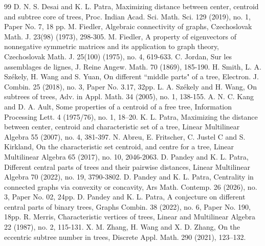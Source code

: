 \documentclass[10pt,a4paper]{amsart}
\begin{document}
\begin{thebibliography}{99}
 D. N. S. Desai and K. L. Patra, Maximizing distance between center, centroid and subtree core of trees, Proc. Indian Acad. Sci. Math. Sci. 129 (2019), no. 1, Paper No. 7, 18 pp.
 M. Fiedler, Algebraic connectivity of graphs, Czechoslovak Math. J. 23(98) (1973), 298-305.
 M. Fiedler, A property of eigenvectors of nonnegative symmetric matrices and its application to graph theory, Czechoslovak Math. J. 25(100) (1975), no. 4, 619-633.  C. Jordan, Sur les assemblages de lignes, J. Reine Angew. Math. 70 (1869), 185-190.
 H. Smith, L. A. Sz\'ekely, H. Wang and S. Yuan, On different ``middle parts" of a tree, Electron. J. Combin. 25 (2018), no. 3, Paper No. 3.17, 32pp.  L. A. Sz\'ekely and H. Wang, On subtrees of trees, Adv. in Appl. Math. 34 (2005), no. 1, 138-155.
 A. N. C. Kang and D. A. Ault, Some properties of a centroid of a free tree, Information Processing Lett. 4 (1975/76), no. 1, 18–20.
 K. L. Patra, Maximizing the distance between center, centroid and characteristic set of a tree, Linear Multilinear Algebra 55 (2007), no. 4, 381-397.
 N. Abreu, E. Fritscher, C. Justel C and S. Kirkland, On the characteristic set centroid, and centre for a tree, Linear Multilinear Algebra 65 (2017), no. 10, 2046-2063.
 D. Pandey and K. L. Patra, Different central parts of trees and their pairwise distances, Linear Multilinear Algebra 70 (2022), no. 19, 3790-3802.
 D. Pandey and K. L. Patra, Centrality in connected graphs via convexity or concavity, Ars Math. Contemp. 26 (2026), no. 3, Paper No. 02, 24pp.
 D. Pandey and K. L. Patra, A conjecture on different central parts of binary trees, Graphs Combin. 38 (2022), no. 6, Paper No. 190, 18pp.
 R. Merris, Characteristic vertices of trees, Linear and Multilinear Algebra 22 (1987), no. 2, 115-131.
 X. M. Zhang, H. Wang and X. D. Zhang, On the eccentric subtree number in trees, Discrete Appl. Math. 290 (2021), 123–132.
\end{thebibliography}
\end{document}
